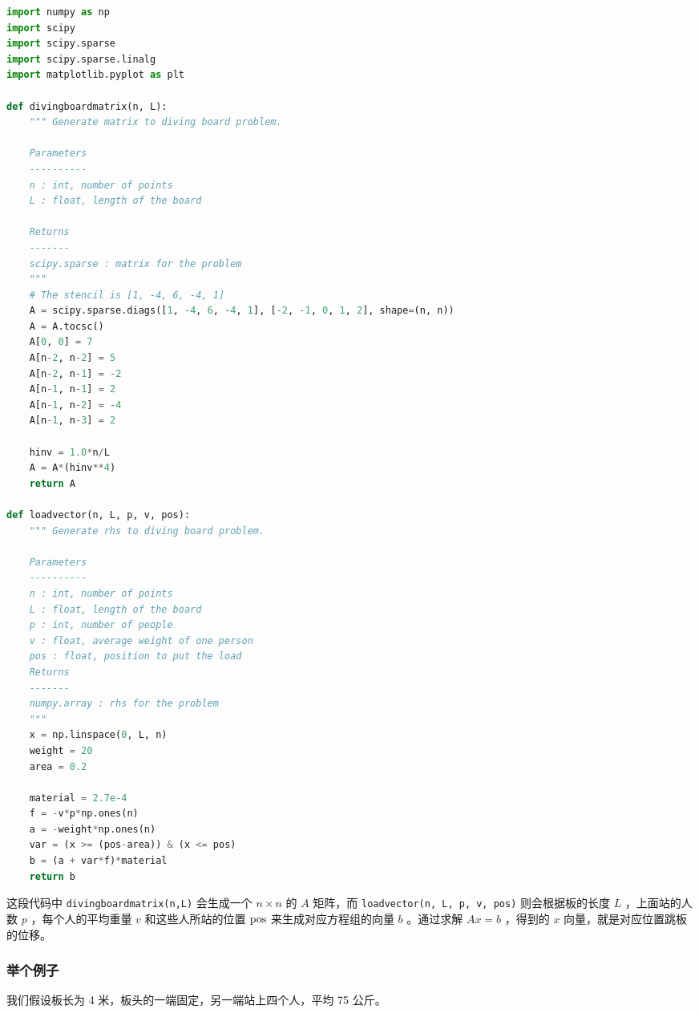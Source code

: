 \begin{lstlisting}[language=python]
import numpy as np
import scipy
import scipy.sparse  
import scipy.sparse.linalg  
import matplotlib.pyplot as plt

def divingboardmatrix(n, L):
    """ Generate matrix to diving board problem.
    
    Parameters
    ----------
    n : int, number of points 
    L : float, length of the board
        
    Returns
    -------
    scipy.sparse : matrix for the problem
    """
    # The stencil is [1, -4, 6, -4, 1]
    A = scipy.sparse.diags([1, -4, 6, -4, 1], [-2, -1, 0, 1, 2], shape=(n, n))
    A = A.tocsc()
    A[0, 0] = 7
    A[n-2, n-2] = 5
    A[n-2, n-1] = -2
    A[n-1, n-1] = 2
    A[n-1, n-2] = -4
    A[n-1, n-3] = 2
    
    hinv = 1.0*n/L
    A = A*(hinv**4)
    return A

def loadvector(n, L, p, v, pos):
    """ Generate rhs to diving board problem.
    
    Parameters
    ----------
    n : int, number of points 
    L : float, length of the board
    p : int, number of people
    v : float, average weight of one person
    pos : float, position to put the load
    Returns
    -------
    numpy.array : rhs for the problem
    """
    x = np.linspace(0, L, n)
    weight = 20
    area = 0.2
    
    material = 2.7e-4
    f = -v*p*np.ones(n)
    a = -weight*np.ones(n)
    var = (x >= (pos-area)) & (x <= pos)
    b = (a + var*f)*material
    return b
\end{lstlisting}

这段代码中 \verb`divingboardmatrix(n,L)` 会生成一个  $n\times n$  的  $A$  矩阵，而 \verb`loadvector(n, L, p, v, pos)` 则会根据板的长度  $L$  ，上面站的人数  $p$  ，每个人的平均重量  $v$  和这些人所站的位置  $\rm{pos}$  来生成对应方程组的向量  $b$  。通过求解  $Ax=b$  ，得到的  $x$  向量，就是对应位置跳板的位移。

\subsubsection{举个例子}

我们假设板长为 4 米，板头的一端固定，另一端站上四个人，平均 75 公斤。

